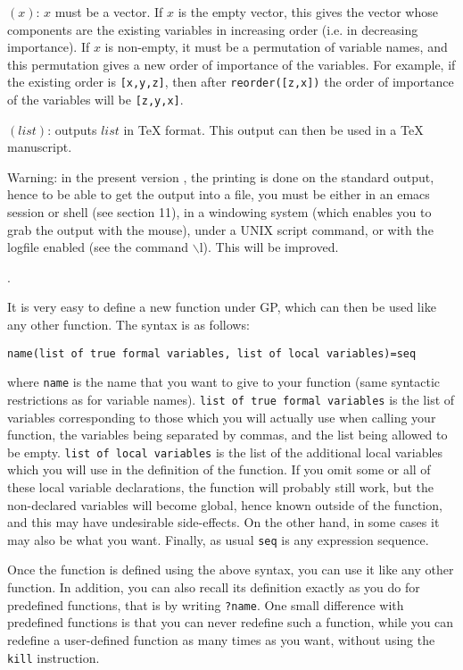 $(x)$: $x$ must be a vector. If $x$ is the empty vector,
this gives the vector whose components are the existing variables in increasing
order (i.e. in decreasing importance). If $x$ is non-empty, it must be a permutation
of variable names, and this permutation gives a new order of importance of the variables.
For example, if the existing order is {\tt [x,y,z]}, then after {\tt reorder([z,x])} the
order of importance of the variables will be {\tt [z,y,x]}.

$(list)$: outputs $list$ in \TeX{} format. This
output can then be used in a \TeX{} manuscript. 

Warning: in the present version \vers, the printing is done on the standard
output, hence to be able to get the output into a file, you must be either
in an emacs session or shell (see section 11), in a windowing system (which enables
you to grab the output with the mouse), under a UNIX script command, or with
the logfile enabled (see the command $\backslash$l). This will be improved.

\smallskip
{}.

It is very easy to define a new function under GP, which can then be used like any other
function. The syntax is as follows:

{\tt name(list of true formal variables, list of local variables)=seq}

where {\tt name} is the name that you want to give to your function (same syntactic
restrictions as for variable names). {\tt list of true formal variables} is the list
of variables corresponding to those which you will actually use when calling your
function, the variables being separated by commas, and the list being allowed to be
empty. {\tt list of local variables} is the list of the additional local variables
which you will use in the definition of the function. If you omit some or all of these
local variable declarations, the function will probably still work, but the non-declared
variables will become global, hence known outside of the function, and this may have
undesirable side-effects. On the other hand, in some cases it may also be what you
want. Finally, as usual {\tt seq} is any expression sequence.

Once the function is defined using the above syntax, you can use it like any other
function. In addition, you can also recall its definition exactly as you do for
predefined functions, that is by writing {\tt ?name}. One small difference
with predefined functions is that you can never redefine such a function, while
you can redefine a user-defined function as many times as you want, without using the
{\tt kill} instruction.

